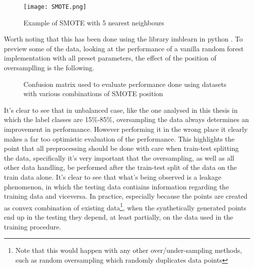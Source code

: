 \begin{figure}[H]
		\centering
  		\texttt{[image: SMOTE.png]}
        \caption{Example of SMOTE with 5 nearest neighbours}
\end{figure}

Worth noting that this has been done using the library imblearn in python \cite{imblearn}. To preview some of the data, looking at the performance of a vanilla random forest implementation with all preset parameters, the effect of the position of oversamplling is the following.


\begin{figure}[H]
\centering
\centering \newline 
        \caption{Confusion matrix used to evaluate performance done using datasets with various combinations of SMOTE position}\label{fig:smote_after}
\end{figure}

It's clear to see that in unbalanced case, like the one analysed in this thesis in which the label classes are 15$\%$-85$\%$, oversampling the data always determines an improvement in performance. However performing it in the wrong place it clearly makes a far too optimistic evaluation of the performance. This highlights the point that all preprocessing should be done with care when train-test splitting the data, specifically it's very important that the oversampling, as well as all other data handling, be performed after the train-test split of the data on the train data alone. It's clear to see that what's being observed is a leakage phenomenon, in which the testing data contiains information regarding the training data and viceversa. In practice, especially because the points are created as convex combination of existing data\footnote{Note that this would happen with any other over/under-sampling methods, such as random oversampling which randomly duplicates data points}, when the synthetically generated points end up in the testing they depend, at least partially, on the data used in the training procedure.

